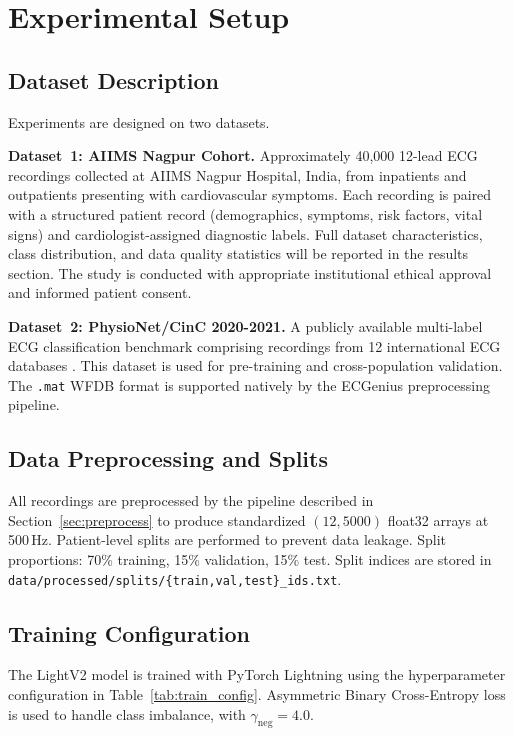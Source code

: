 \documentclass[journal]{IEEEtran}
\begin{document}
\section{Experimental Setup}
\label{sec:setup}

\subsection{Dataset Description}

Experiments are designed on two datasets.

\textbf{Dataset~1: AIIMS Nagpur Cohort.}
Approximately 40,000 12-lead ECG recordings collected at AIIMS
Nagpur Hospital, India, from inpatients and outpatients presenting
with cardiovascular symptoms.
Each recording is paired with a structured patient record
(demographics, symptoms, risk factors, vital signs) and
cardiologist-assigned diagnostic labels.
Full dataset characteristics, class distribution, and
data quality statistics will be reported in the results section.
The study is conducted with appropriate institutional ethical
approval and informed patient consent.

\textbf{Dataset~2: PhysioNet/CinC 2020-2021.}
A publicly available multi-label ECG classification benchmark
comprising recordings from 12 international ECG databases
\cite{reyna2020physionet,reyna2021physionet}.
This dataset is used for pre-training and cross-population
validation.
The \texttt{.mat} WFDB format is supported natively by the
ECGenius preprocessing pipeline.

\subsection{Data Preprocessing and Splits}

All recordings are preprocessed by the pipeline described in
Section~\ref{sec:preprocess} to produce standardized
$(12, 5000)$ float32 arrays at 500\,Hz.
Patient-level splits are performed to prevent data leakage.
Split proportions: 70\% training, 15\% validation, 15\% test.
Split indices are stored in
\texttt{data/processed/splits/\{train,val,test\}\_ids.txt}.

\subsection{Training Configuration}
\label{sec:training_config}

The LightV2 model is trained with PyTorch Lightning using the
hyperparameter configuration in Table~\ref{tab:train_config}.
Asymmetric Binary Cross-Entropy loss \cite{ridnik2021asymmetric}
is used to handle class imbalance, with $\gamma_{\text{neg}} = 4.0$.
\end{document}
